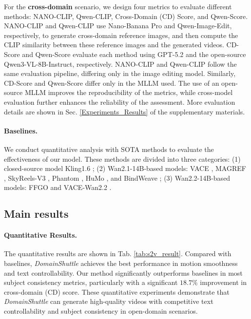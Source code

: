 For the \textbf{cross-domain} scenario, we design four metrics to evaluate different methods: NANO-CLIP, Qwen-CLIP, Cross-Domain (CD) Score, and Qwen-Score. NANO-CLIP and Qwen-CLIP use Nano-Banana Pro\cite{nano_banana} and Qwen-Image-Edit\cite{wu2025qwenimage}, respectively, to generate cross-domain reference images, and then compute the CLIP similarity between these reference images and the generated videos. CD-Score and Qwen-Score evaluate each method using GPT-5.2\cite{gpt52} and the open-source Qwen3-VL-8B-Instruct\cite{bai2025qwen3}, respectively. NANO-CLIP and Qwen-CLIP follow the same evaluation pipeline, differing only in the image editing model. Similarly, CD-Score and Qwen-Score differ only in the MLLM used. The use of an open-source MLLM improves the reproducibility of the metrics, while cross-model evaluation further enhances the reliability of the assessment. More evaluation details are shown in Sec. \ref{Experiments_Results} of the supplementary materials.


\paragraph{\textbf{Baselines.}} We conduct quantitative analysis with SOTA methods to evaluate the effectiveness of our model. These methods are divided into three categories: (1) closed-source model Kling1.6 \cite{kling}; (2) Wan2.1-14B-based models: VACE \cite{vace}, MAGREF \cite{deng2026magref}, SkyReels-V3 \cite{skyreelsv3}, Phantom \cite{phantom}, HuMo \cite{chen2025humo}, and BindWeave \cite{li2026bindweave}; (3) Wan2.2-14B-based models: FFGO \cite{chen2025first} and VACE-Wan2.2 \cite{vace}.
%

\subsection{Main results}
\paragraph{\textbf{Quantitative Results.}} The quantitative results are shown in Tab. \ref{tab:s2v_result}. Compared with baselines, \textit{DomainShuttle} achieves the best performance in motion smoothness and text controllability. Our method significantly outperforms baselines in most subject consistency metrics, particularly with a significant $18.7\%$  improvement in cross-domain (CD) score. These quantitative experiments demonstrate that \textit{DomainShuttle} can generate high-quality videos with competitive text controllability and subject consistency in open-domain scenarios.




